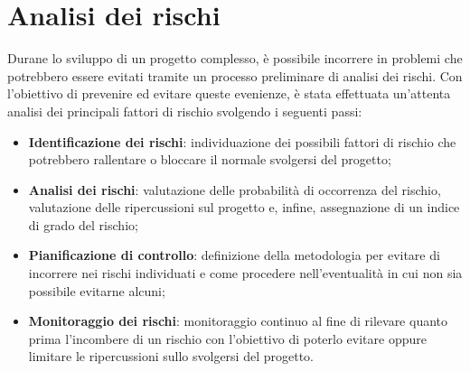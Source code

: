 \documentclass[../piano-di-progetto.tex]{subfiles}
\begin{document}
\section{Analisi dei rischi}
Durane lo sviluppo di un progetto complesso, è possibile incorrere in problemi che potrebbero essere evitati tramite un processo preliminare di analisi dei rischi. Con l'obiettivo di prevenire ed evitare queste evenienze, è stata effettuata un’attenta analisi dei principali fattori di rischio svolgendo i seguenti passi:

\begin{itemize}
    \item \textbf{Identificazione dei rischi}: individuazione dei possibili fattori di rischio che potrebbero rallentare o bloccare il normale svolgersi del progetto;
    \item \textbf{Analisi dei rischi}: valutazione delle probabilità di occorrenza del rischio, valutazione delle ripercussioni sul progetto e, infine, assegnazione di un indice di grado del rischio;
    \item \textbf{Pianificazione di controllo}: definizione della metodologia per evitare di incorrere nei rischi individuati e come procedere nell'eventualità in cui non sia possibile evitarne alcuni;
    \item \textbf{Monitoraggio dei rischi}: monitoraggio continuo al fine di rilevare quanto prima l'incombere di un rischio con l'obiettivo di poterlo evitare oppure limitare le ripercussioni sullo svolgersi del progetto.
\end{itemize}
\end{document}
